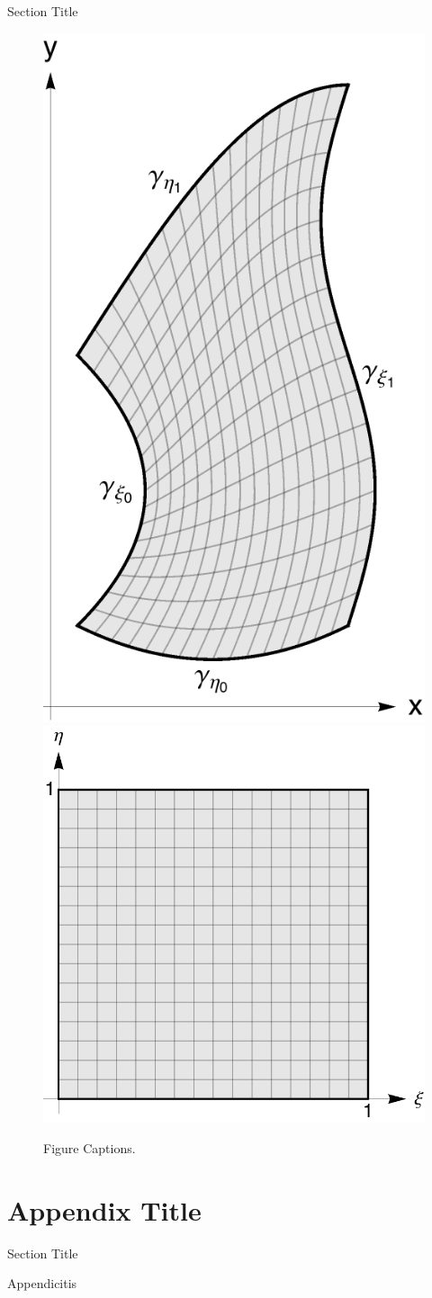 \documentclass[oneside,12pt,final]{ucthesis-CA2012}
\begin{document}
\begin{mainmatter}
\begin{section}{Section Title}
\begin{figure}[t]
\centerline{\includegraphics[width=.35\textwidth]{fig/testfig1.pdf}
\hspace{1cm}\includegraphics[width=.45\textwidth]{fig/testfig2.pdf}}
\caption{Figure Captions.}
\label{fig:label}
\end{figure}

\end{section}



\appendix

\dsp

\chapter{Appendix Title }{\label{appendix:a}}
\begin{section}{Section Title}

Appendicitis

\end{section}
\end{mainmatter}

\ssp


\end{document}
